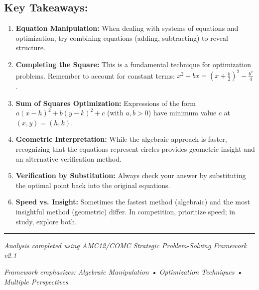 \documentclass[12pt]{article}
\begin{document}
\subsection*{Key Takeaways:}

\begin{enumerate}
    \item \textbf{Equation Manipulation:} When dealing with systems of equations and optimization, try combining equations (adding, subtracting) to reveal structure.
    
    \item \textbf{Completing the Square:} This is a fundamental technique for optimization problems. Remember to account for constant terms: $x^2 + bx = (x + \frac{b}{2})^2 - \frac{b^2}{4}$.
    
    \item \textbf{Sum of Squares Optimization:} Expressions of the form $a(x - h)^2 + b(y - k)^2 + c$ (with $a, b > 0$) have minimum value $c$ at $(x, y) = (h, k)$.
    
    \item \textbf{Geometric Interpretation:} While the algebraic approach is faster, recognizing that the equations represent circles provides geometric insight and an alternative verification method.
    
    \item \textbf{Verification by Substitution:} Always check your answer by substituting the optimal point back into the original equations.
    
    \item \textbf{Speed vs. Insight:} Sometimes the fastest method (algebraic) and the most insightful method (geometric) differ. In competition, prioritize speed; in study, explore both.
\end{enumerate}

\vspace{2em}

\hrule

\vspace{1em}

\begin{center}
\textit{Analysis completed using AMC12/COMC Strategic Problem-Solving Framework v2.1}

\textit{Framework emphasizes: Algebraic Manipulation • Optimization Techniques • Multiple Perspectives}
\end{center}
\end{document}
